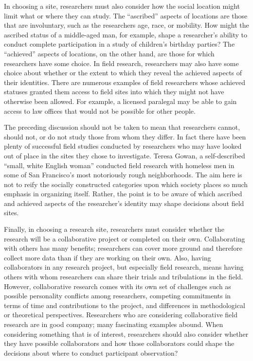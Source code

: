 In choosing a site, researchers must also consider how the social location might limit what or where they can study. The ``ascribed'' aspects of locations are those that are involuntary, such as the researchers age, race, or mobility. How might the ascribed status of a middle-aged man, for example, shape a researcher's ability to conduct complete participation in a study of children's birthday parties? The ``achieved'' aspects of locations, on the other hand, are those for which researchers have some choice. In field research, researchers may also have some choice about whether or the extent to which they reveal the achieved aspects of their identities. There are numerous examples of field researchers whose achieved statuses granted them access to field sites into which they might not have otherwise been allowed. For example, a licensed paralegal may be able to gain access to law offices that would not be possible for other people.

The preceding discussion should not be taken to mean that researchers cannot, should not, or do not study those from whom they differ. In fact there have been plenty of successful field studies conducted by researchers who may have looked out of place in the sites they chose to investigate. Teresa Gowan, a self-described ``small, white English woman'' conducted field research with homeless men in some of San Francisco's most notoriously rough neighborhoods\cite{gowan2010hobos}. The aim here is not to reify the socially constructed categories upon which society places so much emphasis in organizing itself. Rather, the point is to be aware of which ascribed and achieved aspects of the researcher's identity may shape decisions about field sites.

Finally, in choosing a research site, researchers must consider whether the research will be a collaborative project or completed on their own. Collaborating with others has many benefits; researchers can cover more ground and therefore collect more data than if they are working on their own. Also, having collaborators in any research project, but especially field research, means having others with whom researchers can share their trials and tribulations in the field. However, collaborative research comes with its own set of challenges such as possible personality conflicts among researchers, competing commitments in terms of time and contributions to the project, and differences in methodological or theoretical perspectives. Researchers who are considering collaborative field research are in good company; many fascinating examples abound. When considering something that is of interest, researchers should also consider whether they have possible collaborators and how those collaborators could shape the decisions about where to conduct participant observation?

